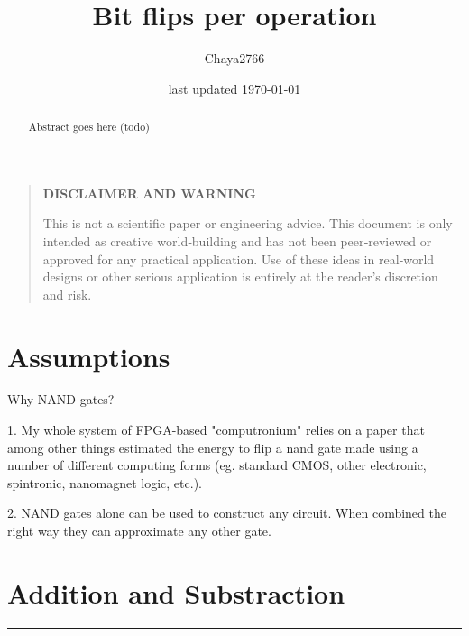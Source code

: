 \documentclass[a4paper]{article}
\title{Bit flips per operation}
\author{Chaya2766}
\date{last updated \today}
\begin{document}
	\sffamily
	\hyphenchar{}
	\sloppy
	
	\maketitle
	
	\textbf{
		\sloppy
		\hyphenchar{}
		}
	
	\vfill
	
	\begin{abstract}
		Abstract goes here (todo)
	\end{abstract}
	
	\vfill
	
	\begin{quote}
		\begin{center}
			\textbf{DISCLAIMER AND WARNING}
		\end{center}
		
		This is not a scientific paper or engineering advice.
		This document is only intended as creative world‑building and has not been peer‑reviewed or approved for any practical application.
		Use of these ideas in real‑world designs or other serious application is entirely at the reader’s discretion and risk.
	\end{quote}
	
	\vfill
	
	\tableofcontents
	
	\pagebreak
	
	\section{Assumptions}
	
	Why NAND gates?
	
	1. My whole system of FPGA-based "computronium" relies on a paper that among other things estimated the energy to flip a nand gate made using a number of different computing forms (eg. standard CMOS, other electronic, spintronic, nanomagnet logic, etc.).
	
	2. NAND gates alone can be used to construct any circuit. When combined the right way they can approximate any other gate.
	
	\pagebreak
	
	\section{Addition and Substraction}
	\label{addition}
	
	\noindent\rule{\linewidth}{0.5pt}
	
\end{document}
